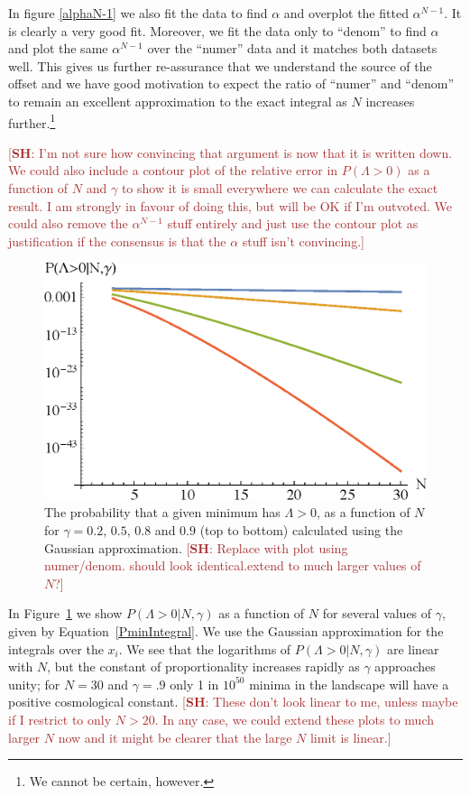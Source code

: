 \documentclass[12pt]{article}
\newcommand{\SH}[1]{\textcolor{brown}{[{\bf SH}: #1]}}
\begin{document}
In figure \ref{alphaN-1} we also fit the data to find $\alpha$ and overplot the fitted $\alpha^{N-1}$. It is clearly a very good fit. Moreover, we fit the data only to ``denom'' to find $\alpha$ and plot the same $\alpha^{N-1}$ over the ``numer'' data and it matches both datasets well. This gives us further re-assurance that we understand the source of the offset and we have good motivation to expect the ratio of ``numer'' and ``denom'' to remain an excellent approximation to the exact integral as $N$ increases further.\footnote{We cannot be certain, however.}


\SH{I'm not sure how convincing that argument is now that it is written down. We could also include a contour plot of the relative error in $P(\Lambda>0)$ as a function of $N$ and $\gamma$ to show it is small everywhere we can calculate the exact result. I am strongly in favour of doing this, but will be OK if I'm outvoted. We could also remove the $\alpha^{N-1}$ stuff entirely and just use the contour plot as justification if the consensus is that the $\alpha$ stuff isn't convincing.}



\begin{figure} 
  \centering
  \includegraphics[width=.6 \linewidth]{pwithN.eps}
  \caption{The probability that a given minimum has $\Lambda>0$, as a function of $N$ for $\gamma=0.2$, $0.5$, $0.8$ and $0.9$ (top to bottom) calculated using the Gaussian approximation. \SH{Replace with plot using numer/denom. should look identical.extend to much larger values of $N$?}}
  \label{PVaryingWithNGaussian}
\end{figure}
  
In  Figure~\ref{PVaryingWithNGaussian} we show $P(\Lambda>0|N,\gamma)$ as a function of $N$ for several values of $\gamma$, given by Equation~\ref{PminIntegral}. We use the Gaussian approximation for the integrals over the $x_i$. We see that the logarithms of $P(\Lambda>0|N,\gamma)$ are linear with $N$, but the constant of proportionality increases rapidly as $\gamma$ approaches unity; for $N=30$ and $\gamma = .9$ only 1 in $10^{50}$ minima in the landscape will have a positive cosmological constant. \SH{These don't look linear to me, unless maybe if I restrict to only $N>20$. In any case, we could extend these plots to much larger $N$ now and it might be clearer that the large $N$ limit is linear.}
\end{document}
